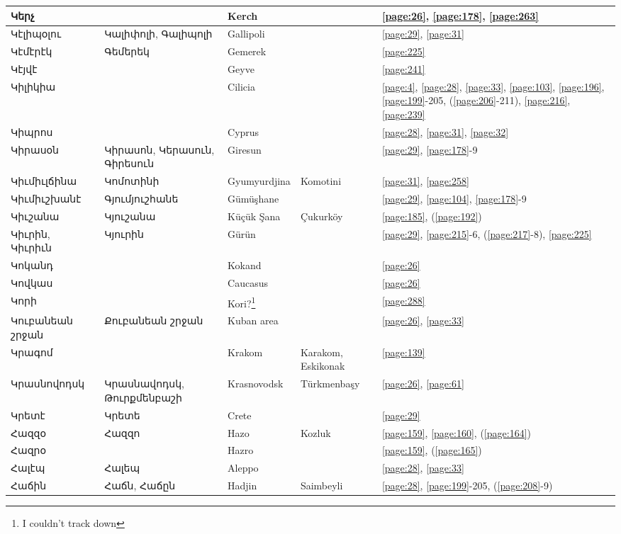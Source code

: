 \begin{center}
\begin{longtable}{|p{}|p{3cm}|p{3cm}|p{2cm}|p{3cm}|}
Կերչ& & Kerch& &\ref{page:26}, \ref{page:178}, \ref{page:263}\\ \hline
Կէլիպօլու&Կալիփոլի, Գալիպոլի & Gallipoli& &\ref{page:29}, \ref{page:31}\\ \hline
Կէմէրէկ& Գեմերեկ&  Gemerek & &\ref{page:225}\\ \hline
Կէյվէ& &Geyve & &\ref{page:241}\\ \hline
Կիլիկիա& &Cilicia & &\ref{page:4}, \ref{page:28}, \ref{page:33}, \ref{page:103}, \ref{page:196}, \ref{page:199}-205, (\ref{page:206}-211), \ref{page:216}, \ref{page:239}\\ \hline
Կիպրոս& & Cyprus& &\ref{page:28}, \ref{page:31}, \ref{page:32}\\ \hline
Կիրասօն&Կիրասոն, Կերասուն, Գիրեսուն&Giresun & &\ref{page:29}, \ref{page:178}-9\\ \hline
Կիւմիւլճինա& Կոմոտինի&Gyumyurdjina & Komotini&\ref{page:31}, \ref{page:258}\\ \hline
Կիւմիւշխանէ&Գյումյուշհանե &Gümüşhane & &\ref{page:29}, \ref{page:104}, \ref{page:178}-9\\ \hline
Կիւշանա&Կյուշանա &Küçük Şana &Çukurköy  &\ref{page:185}, (\ref{page:192})\\ \hline
Կիւրին, Կիւրիւն &Կյուրին & Gürün& &\ref{page:29}, \ref{page:215}-6, (\ref{page:217}-8), \ref{page:225}\\ \hline
Կոկանդ& & Kokand& &\ref{page:26}\\ \hline
Կովկաս& & Caucasus& &\ref{page:26}\\ \hline
Կորի& & Kori?\footnote{I couldn't track down}& &\ref{page:288}\\ \hline
Կուբանեան շրջան& Քուբանեան շրջան&Kuban area & &\ref{page:26}, \ref{page:33}\\ \hline
Կրագոմ& &Krakom &Karakom, Eskikonak &\ref{page:139}\\ \hline
Կրասնովոդսկ&Կրասնավոդսկ, Թուրքմենբաշի & Krasnovodsk&Türkmenbaşy &\ref{page:26}, \ref{page:61}\\ \hline
Կրետէ&Կրետե & Crete& &\ref{page:29}\\ \hline
Հազզօ& Հազզո& Hazo& Kozluk&\ref{page:159}, \ref{page:160}, (\ref{page:164})\\ \hline
Հազրօ& &Hazro & &\ref{page:159}, (\ref{page:165})\\ \hline
Հալէպ& Հալեպ&Aleppo & &\ref{page:28}, \ref{page:33}\\ \hline
Հաճին&  Հաճն, Հաճըն&Hadjin &Saimbeyli& \ref{page:28}, \ref{page:199}-205, (\ref{page:208}-9)\\ \hline

\end{longtable}
\end{center}
